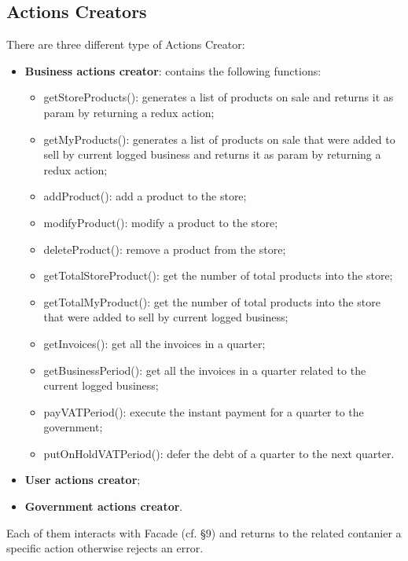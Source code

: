 \subsection{Actions Creators}
There are three different type of Actions Creator:
\begin{itemize}
	\item \textbf{Business actions creator}: contains the following functions: 
	\begin{itemize}
		\item getStoreProducts(): generates a list of products on sale and returns it as param by returning a redux action;
		\item getMyProducts(): generates a list of products on sale that were added to sell by current logged business and returns it as param by returning a redux action;
		\item addProduct(): add a product to the store;
		\item modifyProduct(): modify a product to the store;
		\item deleteProduct(): remove a product from the store;
		\item getTotalStoreProduct(): get the number of total products into the store;
		\item getTotalMyProduct(): get the number of total products into the store that were added to sell by current logged business;
		\item getInvoices(): get all the invoices in a quarter;
		\item getBusinessPeriod(): get all the invoices in a quarter related to the current logged business;
		\item payVATPeriod(): execute the instant payment for a quarter to the government;
		\item putOnHoldVATPeriod(): defer the debt of a quarter to the next quarter.
	\end{itemize}
	\item \textbf{User actions creator};
	\item \textbf{Government actions creator}.
\end{itemize}
Each of them interacts with Facade (cf. §9) and returns to the related contanier a specific action otherwise rejects an error.
